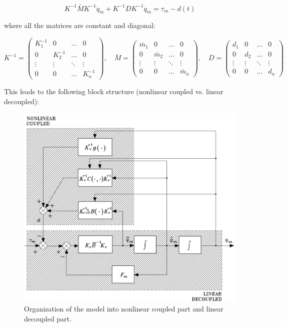 \[
K^{-1}\bar{M}K^{-1}\ddot{q}_m + K^{-1}D K^{-1}\dot{q}_m = \tau_m - d(t)
\]

where all the matrices are constant and diagonal:

\[
K^{-1} =
\begin{pmatrix}
K_1^{-1} & 0 & \dots & 0 \\
0 & K_2^{-1} & \dots & 0 \\
\vdots & \vdots & \ddots & \vdots \\
0 & 0 & \dots & K_n^{-1}
\end{pmatrix},
\quad
\bar{M} =
\begin{pmatrix}
\bar{m}_1 & 0 & \dots & 0 \\
0 & \bar{m}_2 & \dots & 0 \\
\vdots & \vdots & \ddots & \vdots \\
0 & 0 & \dots & \bar{m}_n
\end{pmatrix},
\quad
D =
\begin{pmatrix}
d_1 & 0 & \dots & 0 \\
0 & d_2 & \dots & 0 \\
\vdots & \vdots & \ddots & \vdots \\
0 & 0 & \dots & d_n
\end{pmatrix}
\]

This leads to the following block structure (nonlinear coupled vs. linear decoupled):

\begin{figure}[H]
    \centering
    \includegraphics[width=\linewidth]{imgs/actuation_mechanics_block.png}
    \caption{Organization of the model into nonlinear coupled part and linear decoupled part.}
\end{figure}

